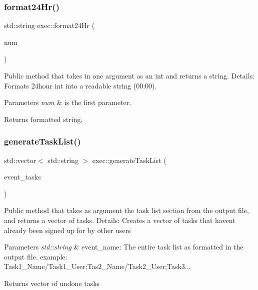 \subsubsection{\texorpdfstring{format24\+Hr()}{format24Hr()}}
{\footnotesize\ttfamily std\+::string exec\+::format24\+Hr (\begin{DoxyParamCaption}\item[{int}]{num }\end{DoxyParamCaption})}

Public method that takes in one argument as an int and returns a string. Details\+: Formats 24hour int into a readable string (00\+:00). 
\begin{DoxyParams}{Parameters}
{\em num} & is the first parameter. \\
\hline
\end{DoxyParams}
\begin{DoxyReturn}{Returns}
formatted string. 
\end{DoxyReturn}
\mbox{\label{classexec_a056e0f55ae4c4661f7485fe8fc221210}} 
\subsubsection{\texorpdfstring{generate\+Task\+List()}{generateTaskList()}}
{\footnotesize\ttfamily std\+::vector$<$ std\+::string $>$ exec\+::generate\+Task\+List (\begin{DoxyParamCaption}\item[{std\+::string}]{event\+\_\+tasks }\end{DoxyParamCaption})}

Public method that takes as argument the task list section from the output file, and returns a vector of tasks. Details\+: Creates a vector of tasks that haven\textquotesingle{}t already been signed up for by other users 
\begin{DoxyParams}{Parameters}
{\em std\+::string} & event\+\_\+name\+: The entire task list as formatted in the output file. example\+: Task1\+\_\+\+Name/\+Task1\+\_\+\+User;Tas2\+\_\+\+Name/\+Task2\+\_\+\+User;Task3... \\
\hline
\end{DoxyParams}
\begin{DoxyReturn}{Returns}
vector of undone tasks 
\end{DoxyReturn}
\mbox{\label{classexec_a82e4d3616bf5ef3790b343de9f255548}} 
